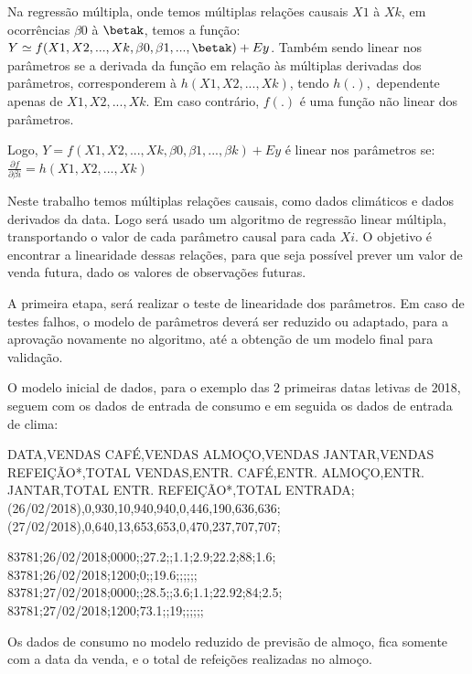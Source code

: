 \documentclass[	12pt, Times, openright, twoside, a4paper, english, brazil]{abntex2}
\begin{document}
          Na regressão múltipla, onde temos múltiplas relações causais $X1$ à $X k$, em ocorrências $\beta0$ à $\betak$, temos a função: $Y \simeq f(X1, X2, ..., X k, \beta0, \beta1, ..., \betak) + E y$. Também sendo linear nos parâmetros se a derivada da função em relação às múltiplas derivadas dos parâmetros, corresponderem à $h(X1,X2,...,X k)$, tendo $h(.),$ dependente apenas de $X1,X2,...,X k$. Em caso contrário, $f(.)$ é uma função não linear dos parâmetros.

          Logo, $Y=f(X1,X2,...,X k,\beta0,\beta1,...,\beta k)+E y$ é linear nos parâmetros se:
          $\frac {\partial f}{\partial \beta i} = h(X1,X2,...,X k)$

          Neste trabalho temos múltiplas relações causais, como dados climáticos e dados derivados da data. Logo será usado um algoritmo de regressão linear múltipla, transportando o valor de cada parâmetro causal para cada $Xi$.
          O objetivo é encontrar a linearidade dessas relações, para que seja possível prever um valor de venda futura, dado os valores de observações futuras.

          A primeira etapa, será realizar o teste de linearidade dos parâmetros. Em caso de testes falhos, o modelo de parâmetros deverá ser reduzido ou adaptado, para a aprovação novamente no algoritmo, até a obtenção de um modelo final para validação.

          O modelo inicial de dados, para o exemplo das 2 primeiras datas letivas de 2018, seguem com os dados de entrada de consumo e em seguida os dados de entrada de clima: 
          \begin{algorithm}
          DATA,VENDAS CAFÉ,VENDAS ALMOÇO,VENDAS JANTAR,VENDAS REFEIÇÃO*,TOTAL VENDAS,ENTR. CAFÉ,ENTR. ALMOÇO,ENTR. JANTAR,TOTAL ENTR. REFEIÇÃO*,TOTAL ENTRADA;
          (26/02/2018),0,930,10,940,940,0,446,190,636,636;
          (27/02/2018),0,640,13,653,653,0,470,237,707,707;   
          \end{algorithm}

          \begin{algorithm}
          83781;26/02/2018;0000;;27.2;;1.1;2.9;22.2;88;1.6;
          83781;26/02/2018;1200;0;;19.6;;;;;;
          83781;27/02/2018;0000;;28.5;;3.6;1.1;22.92;84;2.5;
          83781;27/02/2018;1200;73.1;;19;;;;;;   
          \end{algorithm}

          Os dados de consumo no modelo reduzido de previsão de almoço, fica somente com a data da venda, e o total de refeições realizadas no almoço.
\end{document}
